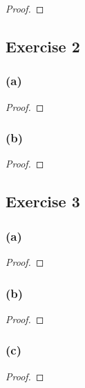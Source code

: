 \documentclass[14pt]{extarticle}
\begin{document}
\begin{proof}

\end{proof}

\subsection{Exercise 2}

\subsubsection{(a)}

\begin{proof}

\end{proof}

\subsubsection{(b)}

\begin{proof}

\end{proof}

\subsection{Exercise 3}

\subsubsection{(a)}

\begin{proof}

\end{proof}

\subsubsection{(b)}

\begin{proof}

\end{proof}

\subsubsection{(c)}

\begin{proof}

\end{proof}
\end{document}
